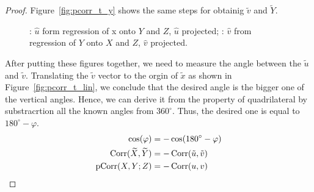 \begin{proof}
Figure~\ref{fig:pcorr_t_y} shows the same steps for obtainig $\tilde v$ and $\widetilde Y$.

\begin{figure}[ht!]
\begin{center}
\caption{: $\hat u$ form regression of x onto $Y$ and $Z$, $\hat u$ projected;
: $\hat v$ from regression of $Y$ onto $X$ and $Z$, $\hat v$ projected.}
\end{center}
\end{figure}



After putting these figures together, we need to measure the angle
between the $\tilde u$ and $\tilde v$.
Translating the $\tilde v$ vector to the orgin of $\tilde x$ as shown in Figure~\ref{fig:pcorr_t_lin},
we conclude that the desired angle is the bigger one of the vertical angles.
Hence, we can derive it from the property of quadrilateral
by substracrtion all the known angles from $360^\circ$.
Thus, the desired one is equal to $180^\circ - \varphi$.
\begin{align*}
\cos(\varphi) &= - \cos(180^\circ - \varphi) \\
\operatorname{Corr}(\widetilde X, \widetilde Y) &= -\operatorname{Corr}(\tilde u, \tilde v) \\
\operatorname{pCorr}(X,Y; Z) &= -\operatorname{Corr}(u, v)
\end{align*}



\end{proof}
